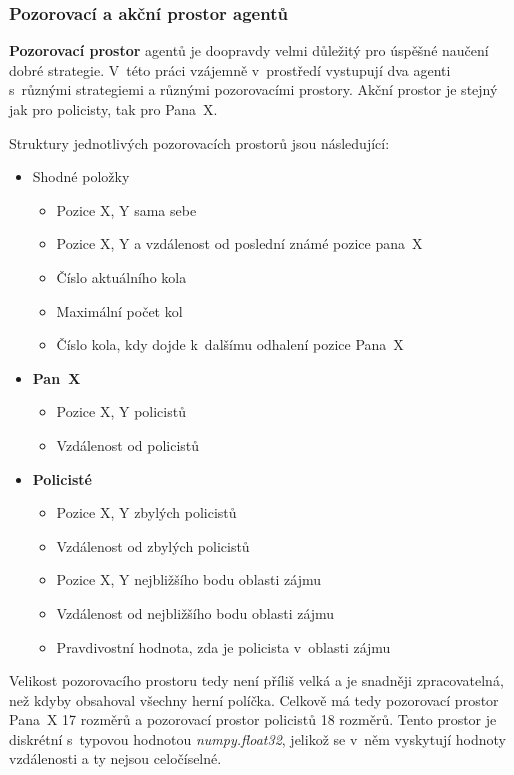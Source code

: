 \subsubsection*{Pozorovací a akční prostor agentů}

\textbf{Pozorovací prostor} agentů je doopravdy velmi důležitý pro úspěšné naučení dobré strategie.
V~této práci vzájemně v~prostředí vystupují dva agenti s~různými strategiemi a různými pozorovacími prostory.
Akční prostor je stejný jak pro policisty, tak pro Pana~X\@.

Struktury jednotlivých pozorovacích prostorů jsou následující:

\begin{itemize}
  \item Shodné položky
    \begin{itemize}
    \item Pozice X, Y sama sebe
    \item Pozice X, Y a vzdálenost od poslední známé pozice pana~X
    \item Číslo aktuálního kola
    \item Maximální počet kol
    \item Číslo kola, kdy dojde k~dalšímu odhalení pozice Pana~X
  \end{itemize}
  \item \textbf{Pan~X}
    \begin{itemize}
    \item Pozice X, Y policistů
    \item Vzdálenost od  policistů
  \end{itemize}
  \item \textbf{Policisté}
    \begin{itemize}
    \item Pozice X, Y zbylých policistů
    \item Vzdálenost od zbylých policistů
    \item Pozice X, Y nejbližšího bodu oblasti zájmu
    \item Vzdálenost od nejbližšího bodu oblasti zájmu
    \item Pravdivostní hodnota, zda je policista v~oblasti zájmu
  \end{itemize}
\end{itemize}

Velikost pozorovacího prostoru tedy není příliš velká a je snadněji zpracovatelná, než kdyby obsahoval všechny herní políčka.
Celkově má tedy pozorovací prostor Pana~X 17 rozměrů a pozorovací prostor policistů 18 rozměrů.
Tento prostor je diskrétní s~typovou hodnotou \emph{numpy.float32}, jelikož se v~něm vyskytují hodnoty vzdálenosti a ty nejsou celočíselné.

